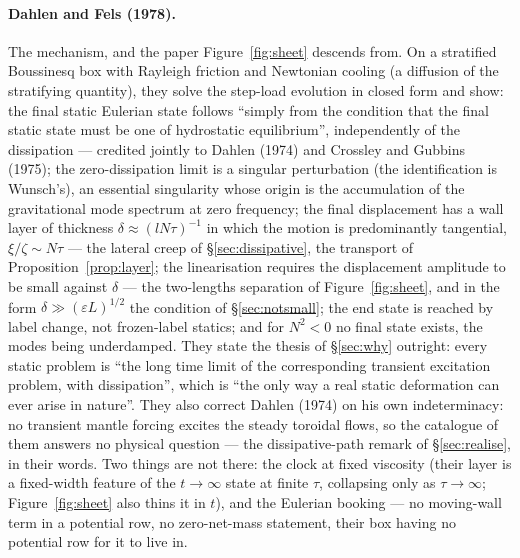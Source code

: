 \documentclass[11pt]{article}
\theoremstyle{definition}
\theoremstyle{remark}
\begin{document}
\paragraph{Dahlen and Fels (1978).} The mechanism, and the paper
Figure~\ref{fig:sheet} descends from. On a stratified Boussinesq box
with Rayleigh friction and Newtonian cooling (a diffusion of the
stratifying quantity), they solve the step-load evolution in closed
form and show: the final static Eulerian state follows ``simply from
the condition that the final static state must be one of hydrostatic
equilibrium'', independently of the dissipation --- credited jointly
to Dahlen (1974) and Crossley and Gubbins (1975); the zero-dissipation
limit is a singular perturbation (the identification is Wunsch's), an
essential singularity whose origin is the accumulation of the
gravitational mode spectrum at zero frequency; the final displacement
has a wall layer of thickness $\delta \approx (lN\tau)^{-1}$ in which
the motion is predominantly tangential, $\xi/\zeta \sim N\tau$ --- the
lateral creep of \S\ref{sec:dissipative}, the transport of
Proposition~\ref{prop:layer}; the linearisation requires the
displacement amplitude to be small against $\delta$ --- the
two-lengths separation of Figure~\ref{fig:sheet}, and in the form
$\delta \gg (\varepsilon L)^{1/2}$ the condition of
\S\ref{sec:notsmall}; the end state is
reached by label change, not frozen-label statics; and for $N^2 < 0$
no final state exists, the modes being underdamped. They state the
thesis of \S\ref{sec:why} outright: every static problem is ``the long
time limit of the corresponding transient excitation problem, with
dissipation'', which is ``the only way a real static deformation can
ever arise in nature''. They also correct Dahlen (1974) on his own
indeterminacy: no transient mantle forcing excites the steady toroidal
flows, so the catalogue of them answers no physical question --- the
dissipative-path remark of \S\ref{sec:realise}, in their words. Two
things are not there: the clock at fixed viscosity (their layer is a
fixed-width feature of the $t \to \infty$ state at finite $\tau$,
collapsing only as $\tau \to \infty$; Figure~\ref{fig:sheet} also
thins it in $t$), and the Eulerian booking --- no moving-wall term in a
potential row, no zero-net-mass statement, their box having no
potential row for it to live in.
\end{document}
